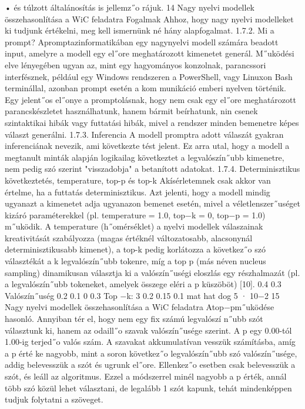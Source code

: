 \documentclass[12pt]{report}
\theoremstyle{definition}
\begin{document}
 • és túlzott általánosítás is jellemz˝o rájuk.
 14
Nagy nyelvi modellek összehasonlítása a WiC feladatra
 Fogalmak
 Ahhoz, hogy nagy nyelvi modelleket ki tudjunk értékelni, meg kell ismernünk né
hány alapfogalmat.
 1.7.2. Mi a prompt?
 Apromptazinformatikában egy nagynyelvi modell számára beadott input, amelyre
 a modell egy el˝ore meghatározott kimenetet generál. M˝uködési elve lényegében ugyan
az, mint egy hagyományos konzolnak, parancssori interfésznek, például egy Windows
 rendszeren a PowerShell, vagy Linuxon Bash terminállal, azonban prompt esetén a kom
munikáció emberi nyelven történik. Egy jelent˝os el˝onye a promptolásnak, hogy nem csak
 egy el˝ore meghatározott parancskészletet használhatunk, hanem bármit beírhatunk, nin
csenek szintaktikai hibák vagy futtatási hibák, mivel a rendszer minden bemenetre képes
 választ generálni.
 1.7.3. Inferencia
 A modell promptra adott válaszát gyakran inferenciának nevezik, ami következte
tést jelent. Ez arra utal, hogy a modell a megtanult minták alapján logikailag következtet
 a legvalószín˝ubb kimenetre, nem pedig szó szerint "visszadobja" a betanított adatokat.
 1.7.4. Determinisztikus következtetés, temperature, top-p és top-k
 Akísérletemnek csak akkor van értelme, ha a futtatás determinisztikus. Azt jelenti,
 hogy a modell mindig ugyanazt a kimenetet adja ugyanazon bemenet esetén, mivel a
 véletlenszer˝uséget kizáró paraméterekkel (pl. temperature = 1.0, top−k = 0, top−p =
 1.0) m˝uködik. A temperature (h˝omérséklet) a nyelvi modellek válaszainak kreativitását
 szabályozza (magas értéknél változatosabb, alacsonynál determinisztikusabb kimenet), a
 top-k pedig korlátozza a következ˝o szó választékát a k legvalószín˝ubb tokenre, míg a top
p (más néven nucleus sampling) dinamikusan választja ki a valószín˝uségi eloszlás egy
 részhalmazát (pl. a legvalószín˝ubb tokeneket, amelyek összege eléri a p küszöböt) [10].
 0.4
 0.3
 Valószín˝uség
 0.2
 0.1
 0
 0.3
 Top −k: 3
 0.2
 0.15
 0.1
 mat hat dog
 5 · 10−2
 15
Nagy nyelvi modellek összehasonlítása a WiC feladatra
 Atop−pm˝uködése hasonló. Annyiban tér el, hogy nem egy fix számú legvalószí
n˝ubb szót választunk ki, hanem az odaill˝o szavak valószín˝usége szerint. A p egy 0.00-tól
 1.00-ig terjed˝o valós szám. A szavakat akkumulatívan vesszük számításba, amíg a p érté
ke nagyobb, mint a soron következ˝o legvalószín˝ubb szó valószín˝usége, addig belevesszük
 a szót és ugrunk el˝ore. Ellenkez˝o esetben csak belevesszük a szót, és leáll az algoritmus.
 Ezzel a módszerrel minél nagyobb a p érték, annál több szó közül lehet választani, de
 legalább 1 szót kapunk, tehát mindenképpen tudjuk folytatni a szöveget.
\end{document}
